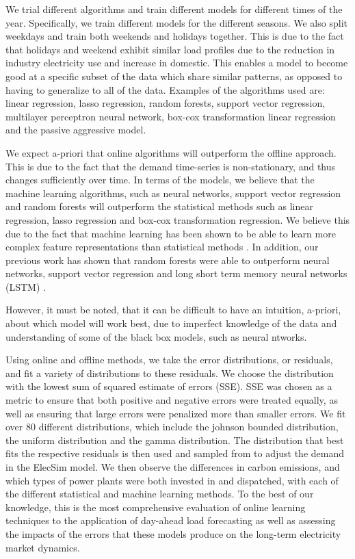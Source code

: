 \documentclass[final,3p,times,twocolumn,numbers]{elsarticle}
\begin{document}
We trial different algorithms and train different models for different times of the year. Specifically, we train different models for the different seasons. We also split weekdays and train both weekends and holidays together. This is due to the fact that holidays and weekend exhibit similar load profiles due to the reduction in industry electricity use and increase in domestic. This enables a model to become good at a specific subset of the data which share similar patterns, as opposed to having to generalize to all of the data. Examples of the algorithms used are: linear regression, lasso regression, random forests, support vector regression, multilayer perceptron neural network, box-cox transformation linear regression and the passive aggressive model. 

We expect a-priori that online algorithms will outperform the offline approach. This is due to the fact that the demand time-series is non-stationary, and thus changes sufficiently over time. In terms of the models, we believe that the machine learning algorithms, such as neural networks, support vector regression and random forests will outperform the statistical methods such as linear regression, lasso regression and box-cox transformation regression. We believe this due to the fact that machine learning has been shown to be able to learn more complex feature representations than statistical methods \cite{Singh2012}. In addition, our previous work has shown that random forests were able to outperform neural networks, support vector regression and long short term memory neural networks (LSTM) \cite{Kell2018}. 

However, it must be noted, that it can be difficult to have an intuition, a-priori, about which model will work best, due to imperfect knowledge of the data and understanding of some of the black box models, such as neural ntworks.



Using online and offline methods, we take the error distributions, or residuals, and fit a variety of distributions to these residuals. We choose the distribution with the lowest sum of squared estimate of errors (SSE). SSE was chosen as a metric to ensure that both positive and negative errors were treated equally, as well as ensuring that large errors were penalized more than smaller errors. We fit over 80 different distributions, which include the johnson bounded distribution, the uniform distribution and the gamma distribution. The distribution that best fits the respective residuals is then used and sampled from to adjust the demand in the ElecSim model. We then observe the differences in carbon emissions, and which types of power plants were both invested in and dispatched, with each of the different statistical and machine learning methods. To the best of our knowledge, this is the most comprehensive evaluation of online learning techniques to the application of day-ahead load forecasting as well as assessing the impacts of the errors that these models produce on the long-term electricity market dynamics.
\end{document}
